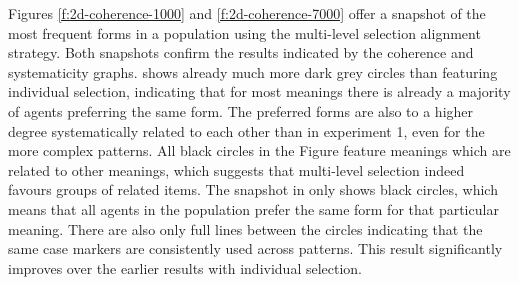 Figures \ref{f:2d-coherence-1000} and \ref{f:2d-coherence-7000} offer a snapshot of the most frequent forms in a population using the multi-level selection alignment strategy. Both snapshots confirm the results indicated by the coherence and systematicity graphs.  shows already much more dark grey circles than  featuring individual selection, indicating that for most meanings there is already a majority of agents preferring the same form. The preferred forms are also to a higher degree systematically related to each other than in experiment 1, even for the more complex patterns. All black circles in the Figure feature meanings which are related to other meanings, which suggests that multi-level selection indeed favours groups of related items. The snapshot in  only shows black circles, which means that all agents in the population prefer the same form for that particular meaning. There are also only full lines between the circles indicating that the same case markers are consistently used across patterns. This result significantly improves over the earlier results with individual selection.
